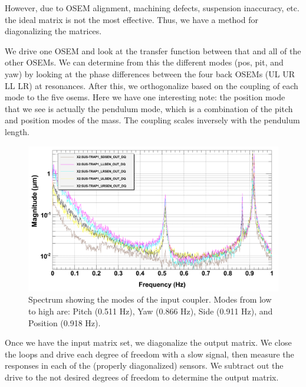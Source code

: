 However, due to OSEM alignment, machining defects, suspension inaccuracy, etc. the ideal matrix is not the most effective. Thus, we have a method for diagonalizing the matrices.

We drive one OSEM and look at the transfer function between that and all of the other OSEMs. We can determine from this the different modes (pos, pit, and yaw) by looking at the phase differences between the four back OSEMs (UL UR LL LR) at resonances. After this, we orthogonalize based on the coupling of each mode to the five osems. Here we have one interesting note: the position mode that we see is actually the pendulum mode, which is a combination of the pitch and position modes of the mass. The coupling scales inversely with the pendulum length.

\begin{figure}[htbp]
	\centering
		\includegraphics[width=.95\textwidth]{figures/suspensions/trap1spec.png}
	\caption[Input coupler spectrum]{Spectrum showing the modes of the input coupler.  Modes from low to high are: Pitch (0.511 Hz), Yaw (0.866 Hz), Side (0.911 Hz), and Position (0.918 Hz). }
	\label{fig:trap1spec}
\end{figure}


Once we have the input matrix set, we diagonalize the output matrix. We close the loops and drive each degree of freedom with a slow signal, then measure the responses in each of the (properly diagonalized) sensors. We subtract out the drive to the not desired degrees of freedom to determine the output matrix. 
%
